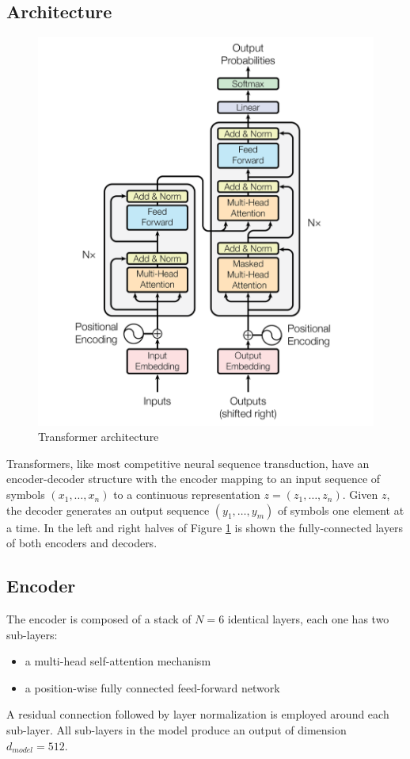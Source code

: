 \documentclass[\main/main.tex]{subfiles}
\begin{document}
\subsection{Architecture}
\begin{figure}[H]
    \centering
    \includegraphics[scale=0.35]{images/transformer/transformer_model_architecture.png}
    \caption{Transformer architecture}
    \label{fig:transformer_architecture}
\end{figure}

Transformers, like most competitive neural sequence transduction, have an encoder-decoder structure with the encoder mapping to an input sequence of symbols $(x_1, \dots, x_n)$ to a continuous representation $z = (z_1, \dots, z_n)$. Given $z$, the decoder generates an output sequence $(y_1, \dots, y_m)$ of symbols one element at a time. In the left and right halves of Figure \ref{fig:transformer_architecture} is shown the fully-connected layers of both encoders and decoders.
\subsection{Encoder}
The encoder is composed of a stack of $N=6$ identical layers, each one has two sub-layers:
\begin{itemize}
    \item a multi-head self-attention mechanism
    \item a position-wise fully connected feed-forward network
\end{itemize}
A residual connection followed by layer normalization is employed around each sub-layer. All sub-layers in the model produce an output of dimension $d_{model} = 512$.
\end{document}

